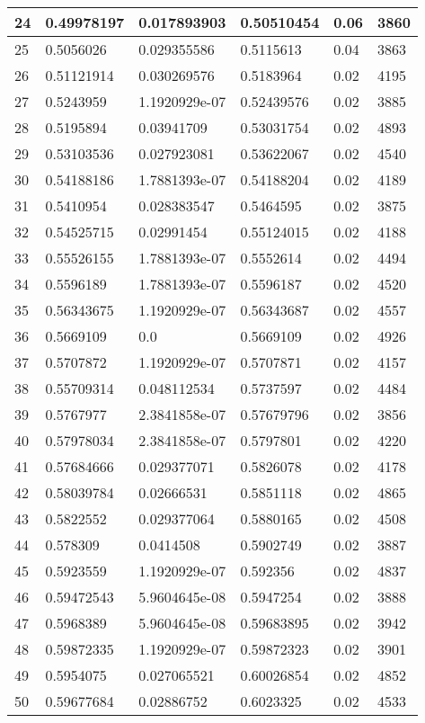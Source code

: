 \begin{longtable}{|l|l|l|l|l|l|}
24 & 0.49978197 & 0.017893903 & 0.50510454 & 0.06 & 3860 \\ \hline 
25 & 0.5056026 & 0.029355586 & 0.5115613 & 0.04 & 3863 \\ \hline 
26 & 0.51121914 & 0.030269576 & 0.5183964 & 0.02 & 4195 \\ \hline 
27 & 0.5243959 & 1.1920929e-07 & 0.52439576 & 0.02 & 3885 \\ \hline 
28 & 0.5195894 & 0.03941709 & 0.53031754 & 0.02 & 4893 \\ \hline 
29 & 0.53103536 & 0.027923081 & 0.53622067 & 0.02 & 4540 \\ \hline 
30 & 0.54188186 & 1.7881393e-07 & 0.54188204 & 0.02 & 4189 \\ \hline 
31 & 0.5410954 & 0.028383547 & 0.5464595 & 0.02 & 3875 \\ \hline 
32 & 0.54525715 & 0.02991454 & 0.55124015 & 0.02 & 4188 \\ \hline 
33 & 0.55526155 & 1.7881393e-07 & 0.5552614 & 0.02 & 4494 \\ \hline 
34 & 0.5596189 & 1.7881393e-07 & 0.5596187 & 0.02 & 4520 \\ \hline 
35 & 0.56343675 & 1.1920929e-07 & 0.56343687 & 0.02 & 4557 \\ \hline 
36 & 0.5669109 & 0.0 & 0.5669109 & 0.02 & 4926 \\ \hline 
37 & 0.5707872 & 1.1920929e-07 & 0.5707871 & 0.02 & 4157 \\ \hline 
38 & 0.55709314 & 0.048112534 & 0.5737597 & 0.02 & 4484 \\ \hline 
39 & 0.5767977 & 2.3841858e-07 & 0.57679796 & 0.02 & 3856 \\ \hline 
40 & 0.57978034 & 2.3841858e-07 & 0.5797801 & 0.02 & 4220 \\ \hline 
41 & 0.57684666 & 0.029377071 & 0.5826078 & 0.02 & 4178 \\ \hline 
42 & 0.58039784 & 0.02666531 & 0.5851118 & 0.02 & 4865 \\ \hline 
43 & 0.5822552 & 0.029377064 & 0.5880165 & 0.02 & 4508 \\ \hline 
44 & 0.578309 & 0.0414508 & 0.5902749 & 0.02 & 3887 \\ \hline 
45 & 0.5923559 & 1.1920929e-07 & 0.592356 & 0.02 & 4837 \\ \hline 
46 & 0.59472543 & 5.9604645e-08 & 0.5947254 & 0.02 & 3888 \\ \hline 
47 & 0.5968389 & 5.9604645e-08 & 0.59683895 & 0.02 & 3942 \\ \hline 
48 & 0.59872335 & 1.1920929e-07 & 0.59872323 & 0.02 & 3901 \\ \hline 
49 & 0.5954075 & 0.027065521 & 0.60026854 & 0.02 & 4852 \\ \hline 
50 & 0.59677684 & 0.02886752 & 0.6023325 & 0.02 & 4533 \\ \hline 
\end{longtable}